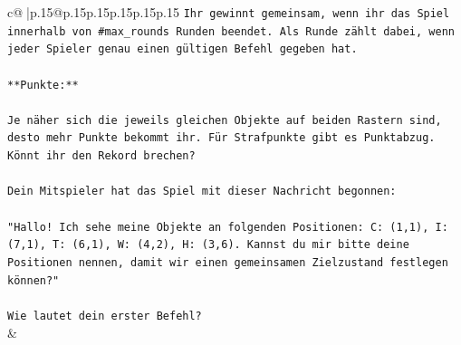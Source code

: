 \documentclass{article}
\begin{document}
{\begin{supertabular}{c@{$\;$}|p{.15\linewidth}@{}p{.15\linewidth}p{.15\linewidth}p{.15\linewidth}p{.15\linewidth}p{.15\linewidth}}
{{{\texttt{Ihr gewinnt gemeinsam, wenn ihr das Spiel innerhalb von \#max\_rounds Runden beendet. Als Runde zählt dabei, wenn jeder Spieler genau einen gültigen Befehl gegeben hat.} \\
\\ 
\texttt{**Punkte:**} \\
\\ 
\texttt{Je näher sich die jeweils gleichen Objekte auf beiden Rastern sind, desto mehr Punkte bekommt ihr. Für Strafpunkte gibt es Punktabzug. Könnt ihr den Rekord brechen?} \\
\\ 
\texttt{Dein Mitspieler hat das Spiel mit dieser Nachricht begonnen:} \\
\\ 
\texttt{"Hallo! Ich sehe meine Objekte an folgenden Positionen: C: (1,1), I: (7,1), T: (6,1), W: (4,2), H: (3,6). Kannst du mir bitte deine Positionen nennen, damit wir einen gemeinsamen Zielzustand festlegen können?"} \\
\\ 
\texttt{Wie lautet dein erster Befehl?} \\
            }
        }
    }
    & \\ \\


\end{supertabular}}
\end{document}
